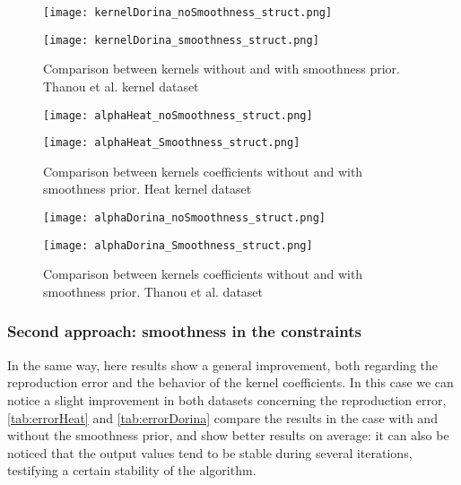 \begin{figure}
  \begin{minipage}[c]{.5\textwidth}
    \centering
    \texttt{[image: kernelDorina\_noSmoothness\_struct.png]}
  \end{minipage}
  \begin{minipage}[c]{.5\textwidth}
    \centering
    \texttt{[image: kernelDorina\_smoothness\_struct.png]}
  \end{minipage}
  \caption{Comparison between kernels without and with smoothness prior. Thanou et al. kernel dataset}
  \label{fig:kernelDorina_struct}
\end{figure}

\begin{figure}
  \centering
  \begin{minipage}[c]{.8\textwidth}
    \centering
    \texttt{[image: alphaHeat\_noSmoothness\_struct.png]}
  \end{minipage}
  \begin{minipage}[c]{.8\textwidth}
    \centering
    \texttt{[image: alphaHeat\_Smoothness\_struct.png]}
  \end{minipage}
  \caption{Comparison between kernels coefficients without and with smoothness prior. Heat kernel   dataset}
  \label{fig:alphaHeat_struct}
\end{figure}

\begin{figure}
  \centering
  \begin{minipage}[c]{.8\textwidth}
    \centering
    \texttt{[image: alphaDorina\_noSmoothness\_struct.png]}
  \end{minipage}
  \begin{minipage}[c]{.8\textwidth}
    \centering
    \texttt{[image: alphaDorina\_Smoothness\_struct.png]}
  \end{minipage}
  \caption{Comparison between kernels coefficients without and with smoothness prior. Thanou et al.   dataset}
  \label{fig:alphaDorina_struct}
\end{figure}

\subsubsection{Second approach: smoothness in the constraints}
In the same way, here results show a general improvement, both regarding the reproduction error and the behavior of the kernel coefficients. In this case we can notice a slight improvement in both datasets concerning the reproduction error, \autoref{tab:errorHeat} and \autoref{tab:errorDorina} compare the results in the case with and without the smoothness prior, and show better results on average: it can also be noticed that the output values tend to be stable during several iterations, testifying a certain stability of the algorithm.

